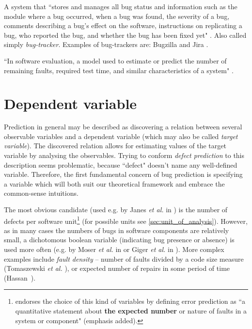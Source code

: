 \documentclass{pracamgr}
\newenvironment{definition}[1]%
  {\medskip
  \begin{adjustwidth}{\parindent}{}
   \rlap{\textbf{#1}}\par\nobreak
  }
  {\end{adjustwidth}}
\begin{document}
\begin{definition}{Bug tracking system}
A system that ``stores and manages all bug status and information such as the module where a bug occurred, when a bug was found, the severity of a bug, comments describing a bug’s effect on the software, instructions on replicating a bug, who reported the bug, and whether the bug has been fixed yet" \cite{adaptive}. Also called simply \emph{bug-tracker}. Examples of bug-trackers are: Bugzilla \cite{bugzilla} and Jira \cite{jira}.
\end{definition}

\begin{definition}{Error model}
``In software evaluation, a model used to estimate or predict the number of remaining faults, required test time, and similar characteristics of a system" \cite[p. 31]{glossary}.
\end{definition}

\section{Dependent variable}
\label{sec:dependent_variable}
Prediction in general may be described as discovering a relation between several observable variables and a dependent variable (which may also be called \textit{target variable}). The discovered relation allows for estimating values of the target variable by analysing the observables. Trying to conform \textit{defect prediction} to this description seems problematic, because ``defect" doesn't name any well-defined variable. Therefore, the first fundamental concern of bug prediction is specifying a variable which will both suit our theoretical framework and embrace the common-sense intuitions.

The most obvious candidate (used e.g. by Janes \textit{et al.} in \cite{Janes}) is the number of defects per software unit\footnote{\cite[p. 31]{glossary} endorses the choice of this kind of variables by defining error prediction as ``a quantitative statement about \textbf{the expected number} or nature of faults in a system or component" (emphasis added).} (for possible units see \ref{sec:unit_of_analysis}). However, as in many cases the numbers of bugs in software components are relatively small, a dichotomous boolean variable (indicating bug presence or absence) is used more often (e.g. by Moser \textit{et al.} in \cite{comparative} or Giger \textit{et al.} in \cite{method-level}). More complex examples include \emph{fault density} -- number of faults divided by a code size measure (Tomaszewski \textit{et al.} \cite{Tomaszewski}), or expected number of repairs in some period of time (Hassan~\cite{complexity}).
\end{document}
